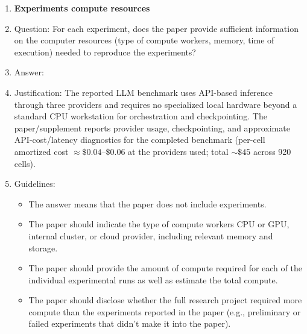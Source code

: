 \begin{enumerate}
\item {\bf Experiments compute resources}
    \item[] Question: For each experiment, does the paper provide sufficient information on the computer resources (type of compute workers, memory, time of execution) needed to reproduce the experiments?
    \item[] Answer: \answerYes{}
    \item[] Justification: The reported LLM benchmark uses API-based inference through three providers and requires no specialized local hardware beyond a standard CPU workstation for orchestration and checkpointing. The paper/supplement reports provider usage, checkpointing, and approximate API-cost/latency diagnostics for the completed benchmark (per-cell amortized cost $\approx \$0.04$--$\$0.06$ at the providers used; total $\sim \$45$ across 920 cells).
    \item[] Guidelines:
    \begin{itemize}
        \item The answer \answerNA{} means that the paper does not include experiments.
        \item The paper should indicate the type of compute workers CPU or GPU, internal cluster, or cloud provider, including relevant memory and storage.
        \item The paper should provide the amount of compute required for each of the individual experimental runs as well as estimate the total compute. 
        \item The paper should disclose whether the full research project required more compute than the experiments reported in the paper (e.g., preliminary or failed experiments that didn't make it into the paper). 
    \end{itemize}
    

\end{enumerate}
